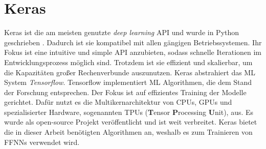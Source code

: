 \section{Keras}
Keras ist die am meisten genutzte \textit{deep learning} API und wurde in Python geschrieben \cite{kerasDoc}.
Dadurch ist sie kompatibel mit allen gängigen Betriebssystemen.
Ihr Fokus ist eine intuitive und simple API anzubieten, sodass schnelle Iterationen im Entwicklungsprozess möglich sind.
Trotzdem ist sie effizient und skalierbar, um die Kapazitäten großer Rechenverbunde auszunutzen.
\newline
\newline
Keras abstrahiert das ML System \textit{Tensorflow}. Tensorflow implementiert ML Algorithmen, die dem Stand der Forschung entsprechen.
Der Fokus ist auf effizientes Training der Modelle \cite{abadi2016tensorflow} gerichtet.
Dafür nutzt es die Multikernarchitektur von CPUs, GPUs und spezialisierter Hardware, sogenannten TPUs (\textbf{T}ensor \textbf{P}rocessing \textbf{U}nit), aus.
Es wurde als open-source Projekt veröffentlicht und ist weit verbreitet.
Keras bietet die in dieser Arbeit benötigten Algorithmen an, weshalb es zum Trainieren von FFNNs verwendet wird.